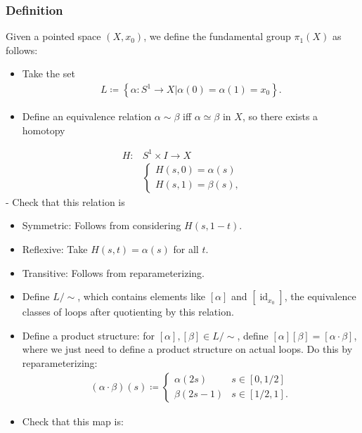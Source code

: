 \hypertarget{definition}{%
\subsubsection{Definition}\label{definition}}

\begin{definition}

Given a pointed space \((X,x_{0})\), we define the fundamental group
\(\pi_{1}(X)\) as follows:

\begin{itemize}
\item
  Take the set
  \begin{align*}
  L \coloneqq\left\{{\alpha: S^1\to X \mathrel{\Big|}\alpha(0) = \alpha(1) = x_{0}}\right\}
  .\end{align*}
\item
  Define an equivalence relation \(\alpha \sim \beta\) iff
  \(\alpha \simeq\beta\) in \(X\), so there exists a homotopy
\end{itemize}

\begin{align*}
H: &S^1 \times I  \to X \\ 
&
\begin{cases}
H(s, 0) = \alpha(s)\\
H(s, 1) = \beta(s) ,
\end{cases}
\end{align*}
- Check that this relation is

\begin{itemize}
\item
  Symmetric: Follows from considering \(H(s, 1-t)\).
\item
  Reflexive: Take \(H(s, t) = \alpha (s)\) for all \(t\).
\item
  Transitive: Follows from reparameterizing.
\item
  Define \(L/\sim\), which contains elements like \([\alpha]\) and
  \([\operatorname{id}_{x_{0}}]\), the equivalence classes of loops
  after quotienting by this relation.
\item
  Define a product structure: for \([\alpha], [\beta] \in L/\sim\),
  define \([\alpha][\beta] = [\alpha \cdot \beta]\), where we just need
  to define a product structure on actual loops. Do this by
  reparameterizing:
  \begin{align*}
  (\alpha \cdot \beta )(s) \coloneqq
  \begin{cases}
  \alpha (2s) &  s \in [0, 1/2]
  \\
  \beta (2s-1) & 
  s \in [1/2, 1]
  .
  \end{cases}
  \end{align*}
\item
  Check that this map is:


\end{itemize}
\end{definition}
